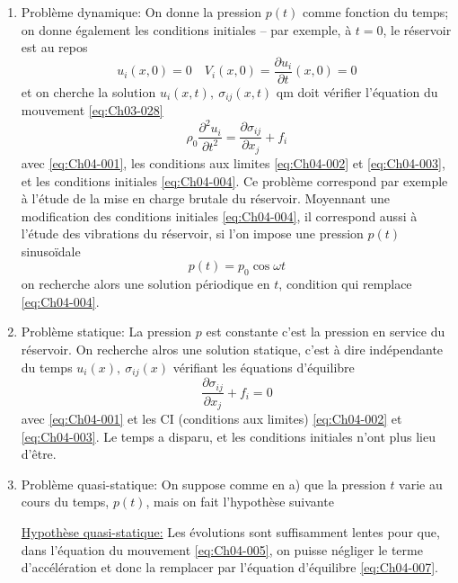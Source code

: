 \begin{enumerate}%
    \item Problème dynamique:  On  donne  la pression  $p(t)$  comme  fonction  du  temps; on  donne  également les  conditions  initiales  -- par  exemple,  à  $t=0$,  le réservoir est au repos
        \begin{equation}
            u_i(x,0)=0 \quad V_i(x,0) = \frac{\partial u_i}{\partial t}(x,0) = 0
            \label{eq:Ch04-004}
        \end{equation}
        et on cherche la solution $u_i(x,t),\ \sigma_{ij}(x,t)$ qm doit vérifier l'équation du mouvement \eqref{eq:Ch03-028}
        \begin{equation}
            \rho_0 \frac{\partial^2 u_i}{\partial t^2} = \frac{\partial \sigma_{ij}}{\partial x_j} + f_i
            \label{eq:Ch04-005}
        \end{equation}
        avec \eqref{eq:Ch04-001}, les conditions aux limites \eqref{eq:Ch04-002} et \eqref{eq:Ch04-003}, et les conditions initiales \eqref{eq:Ch04-004}.
        Ce problème correspond par exemple à l'étude de la mise en charge brutale du réservoir.
        Moyennant une modification des conditions initiales \eqref{eq:Ch04-004}, il correspond aussi à l'étude des vibrations du réservoir, si l'on impose une pression $p(t)$ sinusoïdale
        \begin{equation}
            p(t) = p_0 \cos \omega t
            \label{eq:Ch04-006}
        \end{equation}
        on recherche alors une solution périodique en $t$, condition qui remplace \eqref{eq:Ch04-004}.
    \item Problème statique: La pression $p$ est constante c'est la pression en service du réservoir.
        On recherche alros une solution statique, c'est à dire indépendante du temps $u_i(x),\ \sigma_{ij}(x)$ vérifiant les équations d'équilibre
        \begin{equation}
            \frac{\partial \sigma_{ij}}{\partial x_j} +f_i = 0
            \label{eq:Ch04-007}
        \end{equation}
        avec \eqref{eq:Ch04-001} et les CI (conditions aux limites) \eqref{eq:Ch04-002} et \eqref{eq:Ch04-003}.
        Le temps a disparu, et les conditions initiales n'ont plus lieu d'être.
    \item Problème quasi-statique: On suppose comme en a) que la pression $t$ varie au cours du temps, $p(t)$, mais on fait l'hypothèse suivante
        \par\underline{Hypothèse quasi-statique:} Les évolutions sont suffisamment lentes pour que, dans l'équation du mouvement \eqref{eq:Ch04-005}, on puisse négliger le terme d'accélération et donc la remplacer par l'équation d'équilibre \eqref{eq:Ch04-007}.


\end{enumerate}
